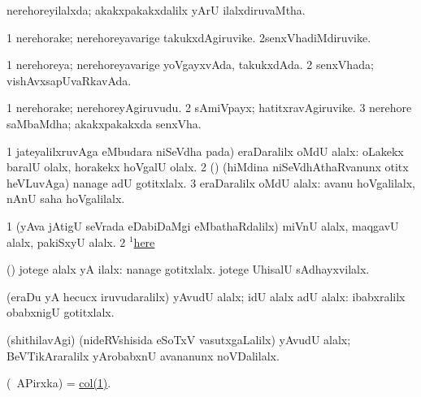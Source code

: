 \bentry
{}
\gl{\gu}
\bmng
nerehoreyilalxda; akakxpakakxdalilx yArU ilalxdiruvaMtha. 
\emng
\eentry

\bentry
{}
\gl{\nA}
\bmng
\bnum
\num{1} nerehorake; nerehoreyavarige takukxdAgiruvike. 
\num{2}senxVhadiMdiruvike. 
\enum
\emng
\eentry


\bentry
{}
\gl{\gu}
\bmng
\bnum
\num{1} nerehoreya; nerehoreyavarige yoVgayxvAda, takukxdAda. 
\num{2} senxVhada; vishAvxsapUvaRkavAda. 
\enum
\emng
\eentry

\bentry
{}
\gl{\nA}
\bmng
\bnum
\num{1} nerehorake; nerehoreyAgiruvudu. 
\num{2} sAmiVpayx; hatitxravAgiruvike. 
\num{3} nerehore saMbaMdha; akakxpakakxda senxVha. 
\enum
\emng
\eentry

\bentry
{}
\gl{\kirxvi}
\bmng
\bnum
\num{1}  jateyalilxruvAga  eMbudara niSeVdha pada) eraDaralilx oMdU alalx:  oLakekx baralU olalx, horakekx hoVgalU olalx. 
\num{2} (\ashi) (hiMdina niSeVdhAthaRvanunx otitx heVLuvAga)  nanage adU gotitxlalx. 
\num{3} eraDaralilx oMdU alalx:  avanu hoVgalilalx, nAnU saha hoVgalilalx. 
\enum
\emng

\noindent
\gl{\pagu}
\bmng
\bnum
\num{1}  (yAva jAtigU seVrada eDabiDaMgi eMbathaRdalilx) miVnU alalx, maqgavU alalx, pakiSxyU alalx. 
\num{2}  \hyperref{kandict_h.pdf}{H}{here(1) pagu(12)}{$^1$here}  
\enum
\emng
\eentry

\bentry
{}
\gl{\saMavayx}
\bmng
(\pArxparx) jotege alalx yA ilalx:  nanage gotitxlalx. jotege UhisalU sAdhayxvilalx. 
\emng
\eentry

\bentry
{}
\gl{\gu}
\bmng
(eraDu yA hecucx iruvudaralilx) yAvudU alalx; idU alalx adU alalx:  ibabxralilx obabxnigU gotitxlalx. 
\emng
\eentry

\bentry
{}
\gl{\sanA}
\bmng
(shithilavAgi) (nideRVshisida eSoTxV vasutxgaLalilx) yAvudU alalx;  BeVTikAraralilx yArobabxnU avananunx noVDalilalx. 
\emng
\eentry

\bentry
{}
\gl{\nA}
\bmng
(\da\ APirxka) = \hyperref{kandict_c.pdf}{C}{col(1)}{col(1)}. 
\emng
\eentry

